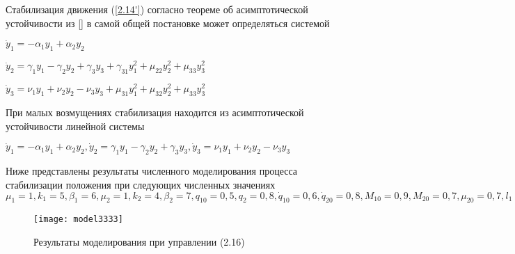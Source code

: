 Стабилизация движения (\ref{2.14'}) согласно теореме об асимптотической устойчивости из [] в самой общей постановке может определяться системой

$\dot y_1 = - \alpha_1 y_1 + \alpha_2 y_2$

$\dot y_2 = \gamma_1 y_1 - \gamma_2 y_2 + \gamma_3 y_3 + \gamma_{31} y_1^2 + \mu_{22} y_2^2 + \mu_{33} y_3^2$

$\dot y_3 = \nu_1 y_1 + \nu_2 y_2 - \nu_3 y_3 + \mu_{31} y_1^2 + \mu_{32} y_2^2 + \mu_{33} y_3^2$

При малых возмущениях стабилизация находится из асимптотической устойчивости линейной системы

$\dot y_1 = - \alpha_1 y_1 + \alpha_2 y_2, \dot y_2 = \gamma_1 y_1 - \gamma_2 y_2 + \gamma_3 y_3, \dot y_3 = \nu_1 y_1 + \nu_2 y_2 - \nu_3 y_3$

Ниже представлены результаты численного моделирования процесса стабилизации положения при следующих численных значениях $\mu_1 = 1, k_1 = 5, \beta_1 = 6, \mu_2 = 1, k_2 = 4, \beta_2 = 7, q_{10} = 0,5, q_2 = 0,8, \dot q_{10} = 0,6, \dot q_{20} = 0,8, M_{10} = 0,9, M_{20} = 0,7, \mu_{20} = 0,7, l_1 = 1 м, l_{g_2} = 0,5 м, I_1 = I_2 = 3,33 кг м 3, m_2 = 10 кг$ 

\begin{figure}[h]
	\centering
	\texttt{[image: model3333]}
	\caption{Результаты моделирования при управлении (2.16)}
	\label{fig:manip22}
\end{figure}